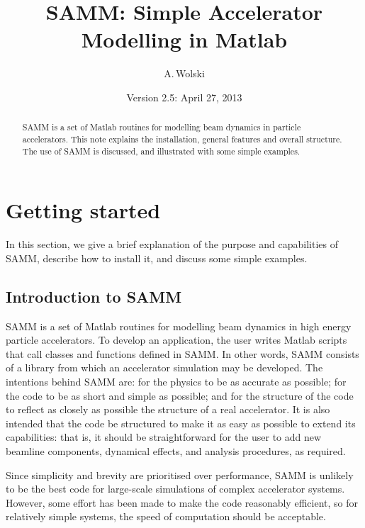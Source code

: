 \documentclass[11pt,twoside,a4paper]{article}
\begin{document}
\title{SAMM: Simple Accelerator Modelling in Matlab}
\author{A.\,Wolski}
\date{Version 2.5: April 27, 2013}

\maketitle

\begin{abstract}
SAMM is a set of Matlab routines for modelling beam dynamics in particle
accelerators.  This note explains the installation, general features and
overall structure. The use of SAMM is discussed, and illustrated with some
simple examples.
\end{abstract}

\newpage

\tableofcontents

\newpage

\section{Getting started}
In this section, we give a brief explanation of the purpose and capabilities
of SAMM, describe how to install it, and discuss some simple examples.

\subsection{Introduction to SAMM}
SAMM is a set of Matlab \cite{cite:matlab} routines for modelling beam dynamics
in high energy particle accelerators.  To develop an application, the user writes
Matlab scripts that call classes and functions defined in SAMM.  In other words,
SAMM consists of a library from which an accelerator simulation may be developed.
The intentions behind SAMM are: for the
physics to be as accurate as possible; for the code to be as short and simple as
possible; and for the structure of the code to reflect as closely as possible the
structure of a real accelerator.  It is also intended that the code be structured
to make it as easy as possible to extend its capabilities: that is, it should be
straightforward for the user to add new beamline
components, dynamical effects, and analysis procedures, as required.

Since simplicity and brevity are prioritised over performance, SAMM is unlikely to be
the best code for large-scale simulations of complex accelerator systems.
However, some effort has been made to make the code reasonably efficient, so for
relatively simple systems, the speed of computation should be acceptable.
\end{document}
